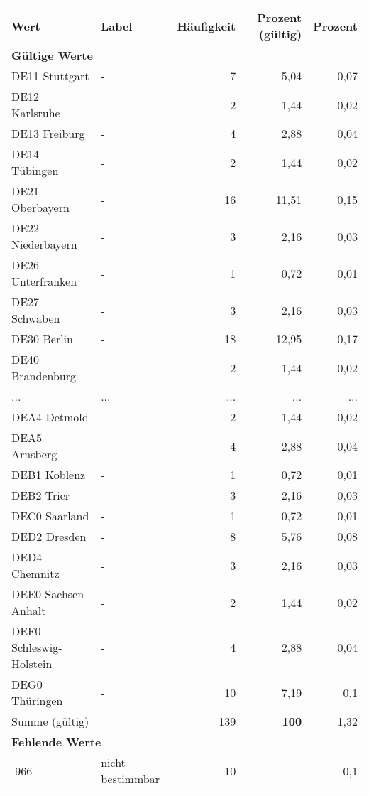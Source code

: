      \begin{longtable}{Xlrrr}
     \toprule
     \textbf{Wert} & \textbf{Label} & \textbf{Häufigkeit} & \textbf{Prozent (gültig)} & \textbf{Prozent} \\
     \endhead
     \midrule
     \multicolumn{5}{l}{\textbf{Gültige Werte}}\\
        \multicolumn{1}{X}{DE11 Stuttgart} & - & 7 & 5,04 & 0,07 \\
        \multicolumn{1}{X}{DE12 Karlsruhe} & - & 2 & 1,44 & 0,02 \\
        \multicolumn{1}{X}{DE13 Freiburg} & - & 4 & 2,88 & 0,04 \\
        \multicolumn{1}{X}{DE14 Tübingen} & - & 2 & 1,44 & 0,02 \\
        \multicolumn{1}{X}{DE21 Oberbayern} & - & 16 & 11,51 & 0,15 \\
        \multicolumn{1}{X}{DE22 Niederbayern} & - & 3 & 2,16 & 0,03 \\
        \multicolumn{1}{X}{DE26 Unterfranken} & - & 1 & 0,72 & 0,01 \\
        \multicolumn{1}{X}{DE27 Schwaben} & - & 3 & 2,16 & 0,03 \\
        \multicolumn{1}{X}{DE30 Berlin} & - & 18 & 12,95 & 0,17 \\
        \multicolumn{1}{X}{DE40 Brandenburg} & - & 2 & 1,44 & 0,02 \\
       ... & ... & ... & ... & ... \\
        \multicolumn{1}{X}{DEA4 Detmold} & - & 2 & 1,44 & 0,02 \\
        \multicolumn{1}{X}{DEA5 Arnsberg} & - & 4 & 2,88 & 0,04 \\
        \multicolumn{1}{X}{DEB1 Koblenz} & - & 1 & 0,72 & 0,01 \\
        \multicolumn{1}{X}{DEB2 Trier} & - & 3 & 2,16 & 0,03 \\
        \multicolumn{1}{X}{DEC0 Saarland} & - & 1 & 0,72 & 0,01 \\
        \multicolumn{1}{X}{DED2 Dresden} & - & 8 & 5,76 & 0,08 \\
        \multicolumn{1}{X}{DED4 Chemnitz} & - & 3 & 2,16 & 0,03 \\
        \multicolumn{1}{X}{DEE0 Sachsen-Anhalt} & - & 2 & 1,44 & 0,02 \\
        \multicolumn{1}{X}{DEF0 Schleswig-Holstein} & - & 4 & 2,88 & 0,04 \\
        \multicolumn{1}{X}{DEG0 Thüringen} & - & 10 & 7,19 & 0,1 \\
     \midrule
      \multicolumn{2}{l}{Summe (gültig)} & 139 &
      \textbf{100} &
         1,32 \\
     \multicolumn{5}{l}{\textbf{Fehlende Werte}}\\
       -966 & nicht bestimmbar & 10 & - & 0,1 \\


\end{longtable}
